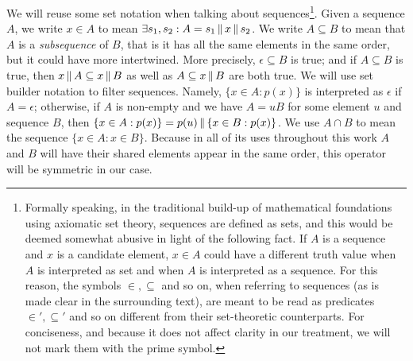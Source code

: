 We will reuse some set notation when talking about sequences\footnote{Formally
speaking, in the traditional build-up of mathematical foundations using
axiomatic set theory, sequences are defined as sets, and this would be deemed
somewhat abusive in light of the following fact. If $A$ is a sequence and $x$ is
a candidate element, $x \in A$ could have a different truth value when $A$ is
interpreted as set and when $A$ is interpreted as a sequence. For this reason,
the symbols $\in, \subseteq$ and so on, when referring to sequences (as is made
clear in the surrounding text), are meant to be read as predicates $\in',
\subseteq'$ and so on different from their set-theoretic counterparts. For
conciseness, and because it does not affect clarity in our treatment, we will
not mark them with the prime symbol.}. Given a sequence $A$, we write $x \in A$
to mean $\exists s_1, s_2: A = s_1 \,\|\, x \,\|\, s_2$. We write
$A \subseteq B$ to mean that $A$ is a \emph{subsequence} of $B$, that is it has
all the same elements in the same order, but it could have more intertwined.
More precisely, $\epsilon \subseteq B$ is true; and if $A \subseteq B$ is true,
then $x \,\|\, A \subseteq x \,\|\, B$ as well as $A \subseteq x \,\|\, B$
are both true. We will use set builder notation to filter sequences. Namely,
$\{x \in A: p(x)\}$ is interpreted as $\epsilon$ if $A = \epsilon$; otherwise,
if $A$ is non-empty and we have $A = uB$ for some element $u$ and sequence $B$,
then $\{x \in A: p(x)\} = p(u) \,\|\, \{x \in B: p(x)\}$. We use $A \cap B$ to
mean the sequence $\{x \in A: x \in B\}$. Because in all of its uses throughout
this work $A$ and $B$ will have their shared elements appear in the same order,
this operator will be symmetric in our case.

